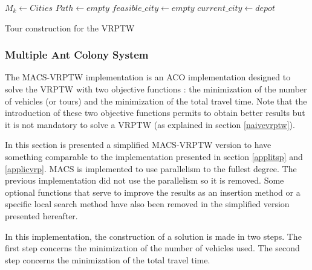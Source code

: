\begin{algorithm}
		$M_k \leftarrow Cities$\;
		$Path \leftarrow empty$\;
		$feasible\_city \leftarrow empty$\;
		$current\_city \leftarrow depot$\;
\caption{Tour construction for the VRPTW}\label{alg:tourVRPTW}
\end{algorithm}

\subsubsection{Multiple Ant Colony System}
The MACS-VRPTW implementation \cite{gambardella1999macs} is an ACO implementation designed to solve the VRPTW with two objective functions : the minimization of the number of vehicles (or tours) and the minimization of the total travel time. Note that the introduction of these two objective functions permits to obtain better results but it is not mandatory to solve a VRPTW (as explained in section \ref{naivevrptw}). 

In this section is presented a simplified MACS-VRPTW version to have something comparable to the implementation presented in section \ref{applitsp} and \ref{applicvrp}. MACS is implemented to use parallelism to the fullest degree. The previous implementation did not use the parallelism so it is removed. Some optional functions that serve to improve the results as an insertion method or a specific local search method have also been removed in the simplified version presented hereafter.

In this implementation, the construction of a solution is made in two steps. The first step concerns the minimization of the number of vehicles used. The second step concerns the minimization of the total travel time.

